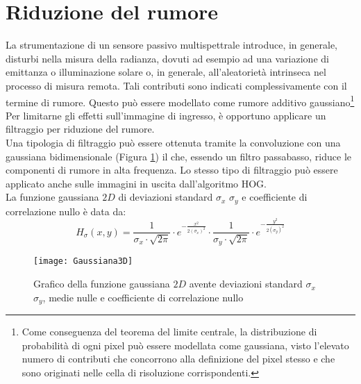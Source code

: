 
\section{Riduzione del rumore}

La strumentazione di un sensore passivo multispettrale introduce, in generale, disturbi nella misura della radianza, dovuti ad esempio ad una variazione di emittanza o illuminazione solare o, in generale, all'aleatorietà intrinseca nel processo di misura remota. Tali contributi sono indicati complessivamente con il termine di rumore. 
Questo può essere modellato come rumore additivo gaussiano\footnote{Come conseguenza del teorema del limite centrale, la distribuzione di probabilità di ogni pixel può essere modellata come gaussiana, visto l'elevato numero di contributi che concorrono alla definizione del pixel stesso e che sono originati nelle cella di risoluzione corrispondenti.}
Per limitarne gli effetti sull'immagine di ingresso, è opportuno applicare un filtraggio per riduzione del rumore.\\

Una tipologia di filtraggio può essere ottenuta tramite la convoluzione con una gaussiana bidimensionale (Figura \ref{fig:Gaussiana3D}) il che, essendo un filtro passabasso, riduce le componenti di rumore in alta frequenza.
Lo stesso tipo di filtraggio può essere applicato anche sulle immagini in uscita dall'algoritmo HOG.\\


La funzione gaussiana $2D$ di deviazioni standard $\sigma_{x}$ $\sigma_{y}$ e coefficiente di correlazione nullo è data da:
\begin{equation}
\label{eq:Gaussiana_continua}
H_{\sigma}(x,y)= \frac{1}{\sigma_{x}\cdot \sqrt{2\pi}}\cdot e^{-\frac{x^{2}}{2(\sigma_{x})^{2}}}\cdot\frac{1}{\sigma_{y}\cdot \sqrt{2\pi}}\cdot e^{-\frac{y^{2}}{2(\sigma_{y})^{2}}}
\end{equation}

\begin{figure}[!ht]
\texttt{[image: Gaussiana3D]}
\caption{Grafico della funzione gaussiana $2D$ avente deviazioni standard $\sigma_{x}$ $\sigma_{y}$, medie nulle e coefficiente di correlazione nullo}
\label{fig:Gaussiana3D}
\end{figure}

